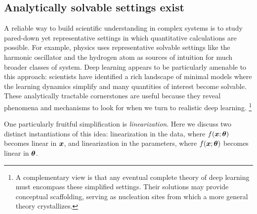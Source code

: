 \subsection{Analytically solvable settings exist}
\label{sec:reason-dynamics}

A reliable way to build scientific understanding in complex systems is to study pared-down yet representative settings in which quantitative calculations are possible.
For example, physics uses representative solvable settings like the harmonic oscillator and the hydrogen atom as sources of intuition for much broader classes of system.
Deep learning appears to be particularly amenable to this approach: scientists have identified a rich landscape of minimal models where the learning dynamics simplify and many quantities of interest become solvable.
These analytically tractable cornerstones are useful because they reveal phenomena and mechanisms to look for when we turn to realistic deep learning.%
\footnote{A complementary view is that any eventual complete theory of deep learning must encompass these simplified settings. Their solutions may provide conceptual scaffolding, serving as nucleation sites from which a more general theory crystallizes.}


One particularly fruitful simplification is \textit{linearization}.
Here we discuss two distinct instantiations of this idea: linearization in the data, where $f({\bm{x}};{\bm{\theta}})$ becomes linear in ${\bm{x}}$, and linearization in the parameters, where $f({\bm{x}};{\bm{\theta}})$ becomes linear in ${\bm{\theta}}$.



